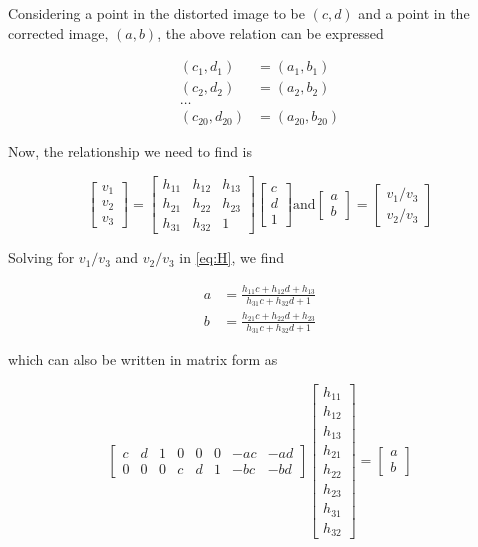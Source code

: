 \documentclass[11pt,a4paper]{article}
\begin{document}
Considering a point in the distorted image to be $(c,d)$ and a point in the corrected image, $(a,b)$, the above relation can be expressed

\begin{align*}
	(c_1,d_1) &= (a_1,b_1) \\
	(c_2,d_2) &= (a_2,b_2) \\
	\ldots \\
	(c_{20},d_{20}) &= (a_{20},b_{20})
\end{align*}

Now, the relationship we need to find is

\begin{equation} \label{eq:H}
	\begin{bmatrix}
		v_1 \\
		v_2 \\
		v_3
	\end{bmatrix}
	=
	\begin{bmatrix}
		h_11 & h_12 & h_13 \\
		h_21 & h_22 & h_23 \\
		h_31 & h_32 & 1
	\end{bmatrix}
	\begin{bmatrix}
		c \\
		d \\
		1
	\end{bmatrix} 
	\text{and}
	\begin{bmatrix}
		a \\
		b
	\end{bmatrix}
	=
	\begin{bmatrix}
		v_1/v_3 \\
		v_2/v_3
	\end{bmatrix}
\end{equation}

Solving for $v_1/v_3$ and $v_2/v_3$ in \ref{eq:H}, we find

\begin{align*}
a &= \frac{h_{11} c + h_{12} d + h_{13}}{h_{31} c + h_{32} d + 1} \\
b &= \frac{h_{21} c + h_{22} d + h_{23}}{h_{31} c + h_{32} d + 1}
\end{align*}

which can also be written in matrix form as 

\begin{equation} \label{eq:mapping}
	\begin{bmatrix}
		c & d & 1 & 0 & 0 & 0 & -ac & -ad \\
		0 & 0 & 0 & c & d & 1 & -bc & -bd
	\end{bmatrix}
	\begin{bmatrix}
		h_{11} \\
		h_{12} \\
		h_{13} \\
		h_{21} \\
		h_{22} \\
		h_{23} \\
		h_{31} \\
		h_{32}
	\end{bmatrix}
	=
	\begin{bmatrix}
		a \\
		b
	\end{bmatrix}
\end{equation}
\end{document}
